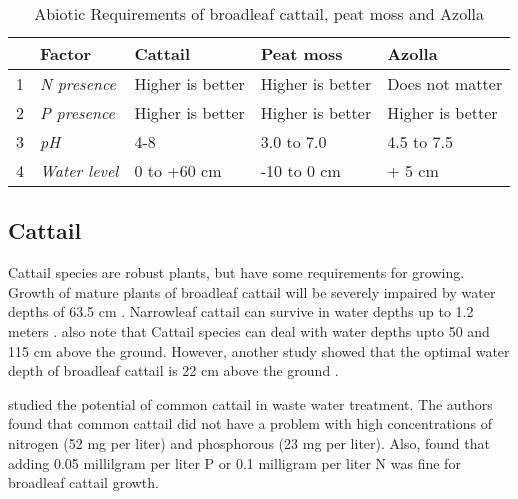 \documentclass[a4paper,12pt]{scrbook}
\begin{document}
\begin{table}[htbp]
\caption{Abiotic Requirements of broadleaf cattail, peat moss and Azolla}
\begin{flushleft}
\begin{tabular}{|r|l|l|l|l|}
\hline
\multicolumn{1}{|l|}{} & \textbf{Factor} & \textbf{Cattail} & \textbf{Peat moss} & \textbf{Azolla} \\ \hline
1 & \textit{N presence} &  Higher is better & Higher is better & Does not matter \\ \hline
2 & \textit{P presence} & Higher is better & Higher is better & Higher is better \\ \hline
3 & \textit{pH} & 4-8 & 3.0 to 7.0 & 4.5 to 7.5 \\ \hline
4 & \textit{Water level} & 0 to +60 cm & -10 to 0 cm & + 5 cm \\ \hline
\end{tabular}
\end{flushleft}
\label{tab:phy}
\end{table}


\subsection{Cattail}


Cattail species are robust plants, but have some requirements for growing. Growth of mature plants of broadleaf cattail will be severely impaired by water depths of 63.5 cm \citep{morton1975cattails}. Narrowleaf cattail can survive in water depths up to 1.2 meters \citep{morton1975cattails}. \citet{dubbe1988production} also note that Cattail species can deal with water depths upto 50 and 115 cm above the ground. However, another study showed that the optimal water depth of broadleaf cattail is 22 cm above the ground \citep{grace1989effects}.

\citet{ciria2005Typha} studied the potential of common cattail in waste water treatment. The authors found that common cattail did not have a problem with high concentrations of nitrogen (52 mg per liter) and phosphorous (23 mg per liter). Also, \citet{newman1996effects} found that adding 0.05 millilgram per liter P or 0.1 milligram per liter N was fine for broadleaf cattail growth.
\end{document}
